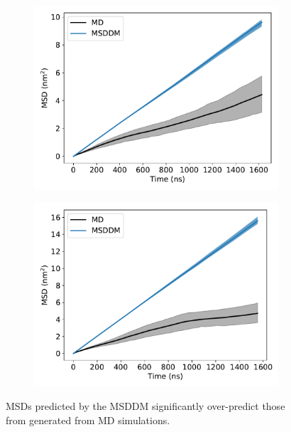 \documentclass{article}
\begin{document}
  \begin{figure}
  \centering
  \begin{subfigure}{0.45\textwidth}
  \includegraphics[width=\textwidth]{URE_msddm.pdf}
  \caption{}\label{fig:URE_msddm}
  \end{subfigure}
  \begin{subfigure}{0.45\textwidth}
  \includegraphics[width=\textwidth]{GCL_msddm.pdf}
  \caption{}\label{fig:GCL_msddm}
  \end{subfigure}
  \caption{MSDs predicted by the MSDDM significantly over-predict those
  from generated from MD simulations.}\label{fig:msddm_performance}
  \end{figure}
  
\end{document}

